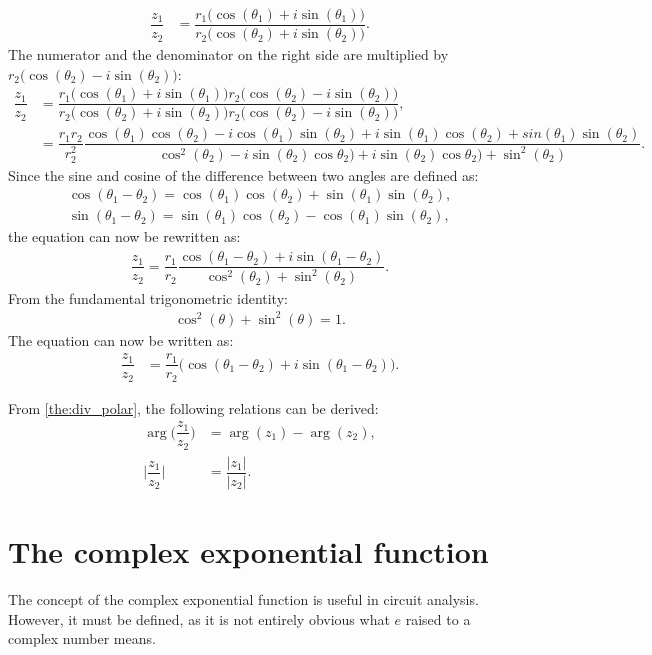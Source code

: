 \begin{prof}{}{}
\begin{align*}
\dfrac{z_1}{z_2}&=\dfrac{r_1\Big(\cos(\theta_1)+i\sin(\theta_1)\Big)}{r_2\Big(\cos(\theta_2)+i\sin(\theta_2)\Big)}.
\end{align*}
The numerator and the denominator on the right side are multiplied by $r_2\Big(\cos(\theta_2)-i\sin(\theta_2)\Big)$:
\begin{align*}
\dfrac{z_1}{z_2}&=\dfrac{r_1\Big(\cos(\theta_1)+i\sin(\theta_1)\Big)r_2\Big(\cos(\theta_2)-i\sin(\theta_2)\Big)}{r_2\Big(\cos(\theta_2)+i\sin(\theta_2)\Big)r_2\Big(\cos(\theta_2)-i\sin(\theta_2)\Big)},
\\
&=\dfrac{r_1 r_2}{r_2^2}  \dfrac{\cos(\theta_1)\cos(\theta_2)-i\cos(\theta_1)\sin(\theta_2)+i\sin(\theta_1)\cos(\theta_2)+sin(\theta_1)\sin(\theta_2)}{\cos^2(\theta_2)-i\sin(\theta_2)\cos\theta_2)+i\sin(\theta_2)\cos\theta_2)+\sin^2(\theta_2)}.
\end{align*}
Since the sine and cosine of the difference between two angles are defined as:
\begin{align*}
\cos(\theta_1-\theta_2)=\cos(\theta_1)\cos(\theta_2)+\sin(\theta_1)\sin(\theta_2),
\\
\sin(\theta_1-\theta_2)=\sin(\theta_1)\cos(\theta_2)-\cos(\theta_1)\sin(\theta_2),
\end{align*}
the equation can now be rewritten as:
\begin{align*}
\dfrac{z_1}{z_2}=\dfrac{r_1}{r_2}  \dfrac{\cos(\theta_1-\theta_2)+i\sin(\theta_1-\theta_2)}{\cos^2(\theta_2)+\sin^2(\theta_2)}.
\end{align*}
From the fundamental trigonometric identity: 
\begin{align*}
\cos^2(\theta)+\sin^2(\theta)=1.
\end{align*}
The equation can now be written as:
\begin{align*}
\dfrac{z_1}{z_2}&=\dfrac{r_1}{r_2}\Big( \cos(\theta_1-\theta_2)+ i \sin(\theta_1-\theta_2)\Big).
\end{align*}
\end{prof}
\noindent From \cref{the:div_polar}, the following relations can be derived:
\begin{align}
\arg\Big(\dfrac{z_1}{z_2}\Big)&=\arg(z_1)-\arg(z_2),
\\
\Big|\dfrac{z_1}{z_2}\Big|&=\dfrac{|z_1|}{|z_2|}. \label{eq:mod_div}
\end{align}

\section{The complex exponential function}
The concept of the complex exponential function is useful in circuit analysis. However, it must be defined, as it is not entirely obvious what $e$ raised to a complex number means.

